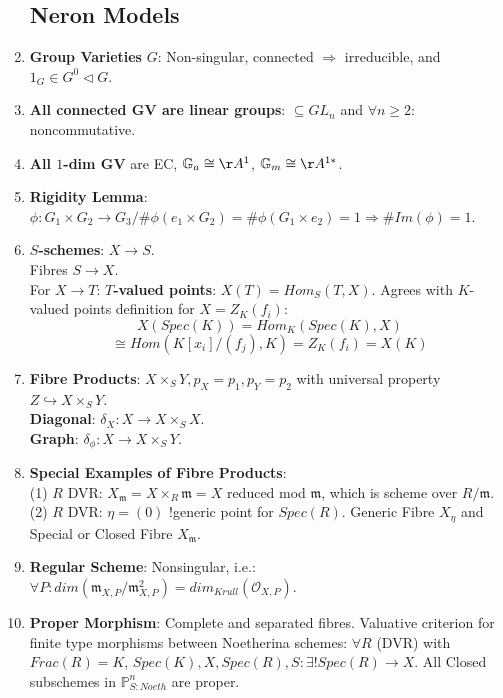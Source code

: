 \documentclass{article}
\newcommand{\PP}{\mathbb{P}}
\newcommand{\OO}{\mathcal{O}}
\newcommand{\mm}{\mathfrak{m}}
\newcommand{\ra}{\rightarrow}
\newcommand{\Ra}{\Rightarrow}
\newcommand{\hra}{\hookrightarrow}
\begin{document}
\begin{multicols}{2}
\begin{enumerate}
\subsection{Neron Models}
\item \textbf{Group Varieties} $G$: Non-singular, connected $\Ra$ irreducible, and $1_G \in G^0 \triangleleft G$.
\item \textbf{All connected GV are linear groups}: $\subseteq GL_n$ and $\forall n \geq 2:$ noncommutative.

\item \textbf{All $1$-dim GV} are EC, $\mathbb{G}_a \cong \AA^1$, $\mathbb{G}_m \cong \AA^{1*}$. 

\item \textbf{Rigidity Lemma}: $\phi: G_1 \times G_2 \ra G_3/ \#\phi(e_1 \times G_2) = \#\phi(G_1 \times e_2) = 1 \Ra \#Im(\phi) = 1$.

\item \textbf{$S$-schemes}: $X \ra S$.\\
Fibres $S \ra X$.\\
For $X \ra T$: \textbf{$T$-valued points}: $X(T) = Hom_S(T,X)$. Agrees with $K$-valued points definition for $X = Z_K(f_i)$:
\[X(Spec(K)) = Hom_K(Spec(K),X)\]\[\cong Hom(K[x_i]/(f_j), K) = Z_K(f_i) = X(K)\] 

\item \textbf{Fibre Products}: $X\times_S Y, p_X = p_1, p_Y = p_2$ with universal property $Z \hra X \times_S Y$.\\
\textbf{Diagonal}: $\delta_X: X \ra X \times_S X$.\\
\textbf{Graph}: $\delta_{\phi}: X \ra X \times_S Y$.\\

\item \textbf{Special Examples of Fibre Products}:\\
(1) $R$ DVR: $X_\mm = X \times_R \mm = X$ reduced mod $\mm$, which is scheme over $R/\mm$. \\
(2) $R$ DVR: $\eta = (0)$ !generic point for $Spec(R)$. Generic Fibre $X_\eta$ and Special or Closed Fibre $X_\mm$. 

\item \textbf{Regular Scheme}: Nonsingular, i.e.: $\forall P: dim(\mm_{X,P}/\mm^2_{X,P}) = dim_{Krull}(\OO_{X,P})$.

\item \textbf{Proper Morphism}: Complete and separated fibres. Valuative criterion for finite type morphisms between Noetherina schemes: $\forall R$ (DVR) with $Frac(R) = K$, $Spec(K),X,Spec(R),S: \exists! Spec(R) \ra X$. All Closed subschemes in $\PP^n_{S:Noeth}$ are proper. 


\end{enumerate}
\end{multicols}
\end{document}
